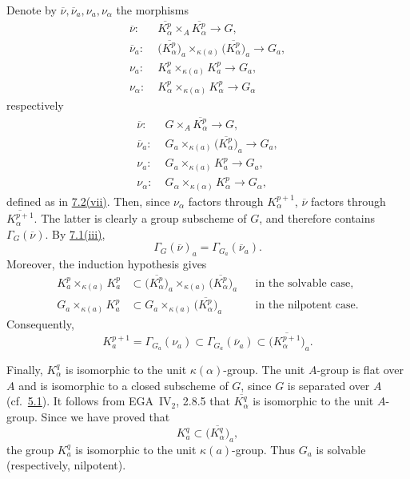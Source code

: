 Denote by \(\overline{\nu},\overline{\nu}_a,\nu_a,\nu_\alpha\)
the morphisms
\label{form:sga3-VIB-8.4-nu-solvable}%
\[
\begin{aligned}
  \overline{\nu}:\;&
    \overline{K_\alpha^p}\times_A\overline{K_\alpha^p}
    \longrightarrow G,\\
  \overline{\nu}_a:\;&
    \bigl(\overline{K_\alpha^p}\bigr)_a
    \times_{\kappa(a)}
    \bigl(\overline{K_\alpha^p}\bigr)_a
    \longrightarrow G_a,\\
  \nu_a:\;&K_a^p\times_{\kappa(a)}K_a^p
    \longrightarrow G_a,\\
  \nu_\alpha:\;&K_\alpha^p\times_{\kappa(\alpha)}K_\alpha^p
    \longrightarrow G_\alpha
\end{aligned}
\]
respectively
\label{form:sga3-VIB-8.4-nu-nilpotent}%
\[
\begin{aligned}
  \overline{\nu}:\;&G\times_A\overline{K_\alpha^p}
    \longrightarrow G,\\
  \overline{\nu}_a:\;&
    G_a\times_{\kappa(a)}
    \bigl(\overline{K_\alpha^p}\bigr)_a
    \longrightarrow G_a,\\
  \nu_a:\;&G_a\times_{\kappa(a)}K_a^p
    \longrightarrow G_a,\\
  \nu_\alpha:\;&G_\alpha\times_{\kappa(\alpha)}K_\alpha^p
    \longrightarrow G_\alpha,
\end{aligned}
\]
defined as in \hyperref[def:sga3-VIB-7.2-vii]{7.2\textup{(vii)}}. Then, since \(\nu_\alpha\) factors through \(K_\alpha^{p+1}\),
\(\overline{\nu}\) factors through
\(\overline{K_\alpha^{p+1}}\). The latter is clearly a group
subscheme of \(G\), and therefore contains
\(\Gamma_G(\overline{\nu})\). By
\hyperref[concl:sga3-VIB-7.1-iii]{7.1\textup{(iii)}},
\[
  \Gamma_G(\overline{\nu})_a
    =\Gamma_{G_a}(\overline{\nu}_a).
\]
Moreover, the induction hypothesis gives
\label{form:sga3-VIB-8.4-induction-inclusions}%
\[
\begin{aligned}
  K_a^p\times_{\kappa(a)}K_a^p
  &\subset
  \bigl(\overline{K_\alpha^p}\bigr)_a
  \times_{\kappa(a)}
  \bigl(\overline{K_\alpha^p}\bigr)_a
  &&\text{in the solvable case},\\
  G_a\times_{\kappa(a)}K_a^p
  &\subset
  G_a\times_{\kappa(a)}
  \bigl(\overline{K_\alpha^p}\bigr)_a
  &&\text{in the nilpotent case}.
\end{aligned}
\]
Consequently,
\label{form:sga3-VIB-8.4-Gamma-chain}%
\[
  K_a^{p+1}
  =\Gamma_{G_a}(\nu_a)
  \subset\Gamma_{G_a}(\overline{\nu}_a)
  \subset\bigl(\overline{K_\alpha^{p+1}}\bigr)_a.
\]

Finally, \(K_\alpha^q\) is isomorphic to the unit
\(\kappa(\alpha)\)-group. The unit \(A\)-group is flat over
\(A\) and is isomorphic to a closed subscheme of \(G\), since
\(G\) is separated over \(A\)
\textup{(cf.\ \hyperref[prop:sga3-VIB-5.1]{5.1})}. It follows
from EGA~IV\(_2\), 2.8.5 that
\(\overline{K_\alpha^q}\) is isomorphic to the unit
\(A\)-group. Since we have proved that
\[
  K_a^q\subset\bigl(\overline{K_\alpha^q}\bigr)_a,
\]
the group \(K_a^q\) is isomorphic to the unit
\(\kappa(a)\)-group. Thus \(G_a\) is solvable
\textup{(respectively, nilpotent)}.

